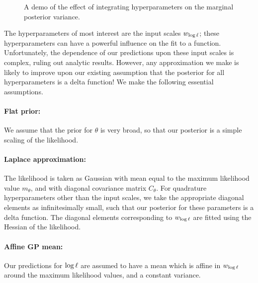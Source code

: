 \documentclass{article}
\begin{document}
\begin{figure}
\centering
{}
\caption{A demo of the effect of integrating hyperparameters on the marginal posterior variance.}
\label{fig:integrate_hypers}
\end{figure}

The hyperparameters of most interest are the input scales $w_\tr$; these hyperparameters can have a powerful influence on the fit to a function. Unfortunately, the dependence of our predictions upon these input scales is complex, ruling out analytic results. However, any approximation we make is likely to improve upon our existing assumption that the posterior for all hyperparameters is a delta function! We make the following essential assumptions.

 \paragraph*{Flat prior:} We assume that the prior for $\theta$ is very broad, so that our posterior is a simple scaling of the likelihood. 
\paragraph*{Laplace approximation:} The likelihood  is taken as Gaussian with mean equal to the maximum likelihood value $m_\theta$, and with diagonal covariance matrix $C_\theta$. For quadrature hyperparameters other than the input scales, we take the appropriate diagonal elements as infinitesimally small, such that our posterior for these parameters is a delta function. The diagonal elements corresponding to $w_\tr$ are fitted using the Hessian of the likelihood.
\paragraph*{Affine GP mean:} Our predictions for $\tr$ are assumed to have a \gpb mean which is affine in $w_\tr$ around the maximum likelihood values, and a constant variance.  
\end{document}
